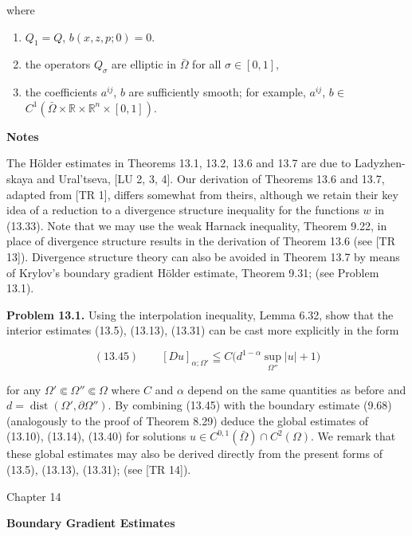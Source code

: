 where

\begin{enumerate}
\item[(i)] $Q_1=Q$, $b(x,z,p;0)=0$.
\item[(ii)] the operators $Q_\sigma$ are elliptic in $\bar{\Omega}$ for all $\sigma\in[0,1]$,
\item[(iii)] the coefficients $a^{ij}$, $b$ are sufficiently smooth; for example, $a^{ij}$, $b\in$
$C^1(\bar{\Omega}\times \mathbb{R}\times \mathbb{R}^n\times[0,1])$.
\end{enumerate}

\textbf{Notes}

The Hölder estimates in Theorems 13.1, 13.2, 13.6 and 13.7 are due to Ladyzhen-
skaya and Ural'tseva, [LU 2, 3, 4]. Our derivation of Theorems 13.6 and 13.7,
adapted from [TR 1], differs somewhat from theirs, although we retain their key
idea of a reduction to a divergence structure inequality for the functions $w$ in
(13.33). Note that we may use the weak Harnack inequality, Theorem 9.22, in place
of divergence structure results in the derivation of Theorem 13.6 (see [TR 13]).
Divergence structure theory can also be avoided in Theorem 13.7 by means of
Krylov's boundary gradient Hölder estimate, Theorem 9.31; (see Problem 13.1).

\textbf{Problem 13.1.} Using the interpolation inequality, Lemma 6.32, show that the
interior estimates (13.5), (13.13), (13.31) can be cast more explicitly in the form

\[
(13.45)\qquad [Du]_{\alpha;\Omega'}\leqq C\bigl(d^{1-\alpha}\sup_{\Omega''}|u|+1\bigr)
\]

for any $\Omega'\Subset\Omega''\Subset\Omega$ where $C$ and $\alpha$ depend on the same quantities as before
and $d=\operatorname{dist}(\Omega',\partial\Omega'')$. By combining (13.45) with the boundary estimate (9.68)
(analogously to the proof of Theorem 8.29) deduce the global estimates of (13.10),
(13.14), (13.40) for solutions $u\in C^{0,1}(\bar{\Omega})\cap C^2(\Omega)$. We remark that these global
estimates may also be derived directly from the present forms of (13.5), (13.13),
(13.31); (see [TR 14]).


\setcounter{chapter}{13}
\noindent Chapter 14

\bigskip

\noindent\textbf{Boundary Gradient Estimates}

\bigskip

